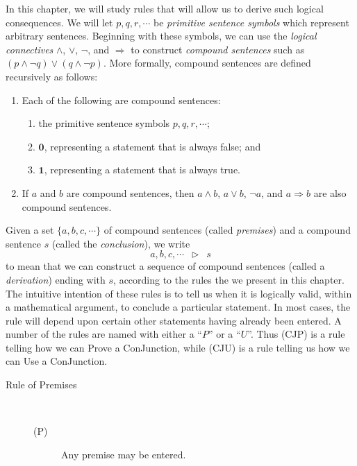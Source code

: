 \documentclass{article}
\newcommand{\0}{\mathbf 0}
\newcommand{\1}{\mathbf 1}
\newcommand{\der}{\vartriangleright}
\begin{document}
In this chapter, we will study rules that will allow us to derive such logical consequences. We will let $p,q,r,\cdots$ be \emph{primitive sentence symbols} which represent arbitrary sentences. Beginning with these symbols, we can use the \emph{logical connectives} $\land$, $\lor$, $\lnot$, and $\Rightarrow$ to construct \emph{compound sentences} such as $(p \land \lnot q) \lor (q \land \lnot p)$. More formally, compound sentences are defined recursively as follows:
\begin{enumerate}[\hspace{1cm}(1.)]
  \item Each of the following are compound sentences:
    \begin{enumerate}[\hspace{1cm}(a.)]
      \item the primitive sentence symbols $p,q,r,\cdots$;
      \item $\0$, representing a statement that is always false; and
      \item $\1$, representing a statement that is always true.
    \end{enumerate}
  \item If $a$ and $b$ are compound sentences, then $a \land b$, $a \lor b$, $\lnot a$, and $a \Rightarrow b$ are also compound sentences.
\end{enumerate}

Given a set $\{a,b,c,\cdots\}$ of compound sentences (called \emph{premises}) and a compound sentence $s$ (called the \emph{conclusion}), we write
\begin{equation*}
a,b,c,\cdots \enspace \der \enspace s
\end{equation*}
to mean that we can construct a sequence of compound sentences (called a \emph{derivation}) ending with $s$, according to the rules the we present in this chapter. The intuitive intention of these rules is to tell us when it is logically valid, within a mathematical argument, to conclude a particular statement. In most cases, the rule will depend upon certain other statements having already been entered. A number of the rules are named with either a ``$P$'' or a ``$U$''. Thus (CJP) is a rule telling how we can Prove a ConJunction, while (CJU) is a rule telling us how we can Use a ConJunction.

\begin{description}
  \item[Rule of Premises] $\ $
    \begin{description}
      \item[(P)] Any premise may be entered.
    \end{description}
\end{description}
\end{document}
